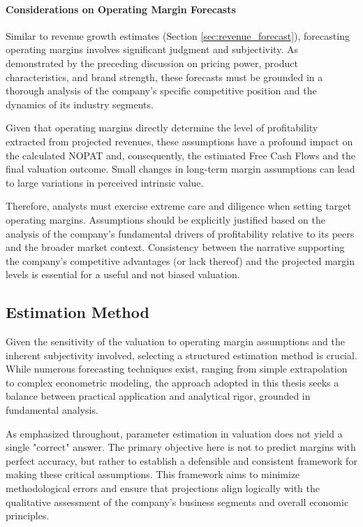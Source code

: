 \paragraph{Considerations on Operating Margin Forecasts}
Similar to revenue growth estimates (Section \ref{sec:revenue_forecast}), forecasting operating margins involves significant judgment and subjectivity. As demonstrated by the preceding discussion on pricing power, product characteristics, and brand strength, these forecasts must be grounded in a thorough analysis of the company's specific competitive position and the dynamics of its industry segments.

Given that operating margins directly determine the level of profitability extracted from projected revenues, these assumptions have a profound impact on the calculated NOPAT and, consequently, the estimated Free Cash Flows and the final valuation outcome. Small changes in long-term margin assumptions can lead to large variations in perceived intrinsic value.

Therefore, analysts must exercise extreme care and diligence when setting target operating margins. Assumptions should be explicitly justified based on the analysis of the company's fundamental drivers of profitability relative to its peers and the broader market context. Consistency between the narrative supporting the company's competitive advantages (or lack thereof) and the projected margin levels is essential for a useful and not biased valuation.

\subsection{Estimation Method} \label{sec:margin_estimation_method}
Given the sensitivity of the valuation to operating margin assumptions and the inherent subjectivity involved, selecting a structured estimation method is crucial. While numerous forecasting techniques exist, ranging from simple extrapolation to complex econometric modeling, the approach adopted in this thesis seeks a balance between practical application and analytical rigor, grounded in fundamental analysis.

As emphasized throughout, parameter estimation in valuation does not yield a single "correct" answer. The primary objective here is not to predict margins with perfect accuracy, but rather to establish a defensible and consistent framework for making these critical assumptions. This framework aims to minimize methodological errors and ensure that projections align logically with the qualitative assessment of the company's business segments and overall economic principles.

